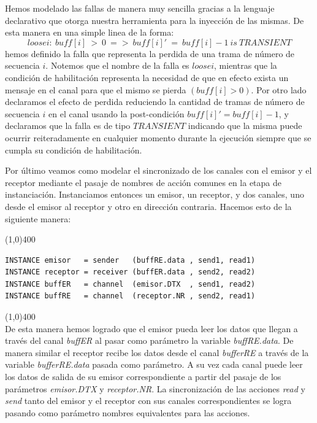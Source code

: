 \documentclass[titlepage, 12pt]{book}
\begin{document}
Hemos modelado las fallas de manera muy sencilla gracias a la lenguaje declarativo que otorga nuestra herramienta para la inyecci\'on de las mismas. De esta manera en una simple linea de la forma: $$ loosei:~buff[i]~>~0~=>~buff[i]'~=~buff[i]-1~is~TRANSIENT $$ hemos definido la falla que representa la perdida de una trama de n\'umero de secuencia $i$. Notemos que el nombre de la falla es $loosei$, mientras que la condici\'on de habilitaci\'on representa la necesidad de que en efecto exista un mensaje en el canal para que el mismo se pierda $( buff[i] > 0 )$. Por otro lado declaramos el efecto de perdida reduciendo la cantidad de tramas de n\'umero de secuencia $i$ en el canal usando la post-condici\'on $buff[i]' = buff[i]-1$, y declaramos que la falla es de tipo $TRANSIENT$ indicando que la misma puede ocurrir reiteradamente en cualquier momento durante la ejecuci\'on siempre que se cumpla su condici\'on de habilitaci\'on.

Por \'ultimo veamos como modelar el sincronizado de los canales con el emisor y el receptor mediante el pasaje de nombres de acci\'on comunes en la etapa de instanciaci\'on. Instanciamos entonces un emisor, un receptor, y dos canales, uno desde el emisor al receptor y otro en direcci\'on contraria. Hacemos esto de la siguiente manera:

\noindent \line(1,0){400}
\begin{verbatim}
INSTANCE emisor   = sender   (buffRE.data , send1, read1)
INSTANCE receptor = receiver (buffER.data , send2, read2)
INSTANCE buffER   = channel  (emisor.DTX  , send1, read2)
INSTANCE buffRE   = channel  (receptor.NR , send2, read1)
\end{verbatim}
\noindent \line(1,0){400}\\

De esta manera hemos logrado que el emisor pueda leer los datos que llegan a trav\'es del canal \textit{buffER} al pasar como par\'ametro la variable \textit{buffRE.data}. De manera similar el receptor recibe los datos desde el canal \textit{bufferRE} a trav\'es de la variable \textit{bufferRE.data} pasada como par\'ametro. A su vez cada canal puede leer los datos de salida de su emisor correspondiente a partir del pasaje de los par\'ametros \textit{emisor.DTX} y \textit{receptor.NR}. La sincronizaci\'on de las acciones \textit{read} y \textit{send} tanto del emisor y el receptor con sus canales correspondientes se logra pasando como par\'ametro nombres equivalentes para las acciones.
\end{document}
